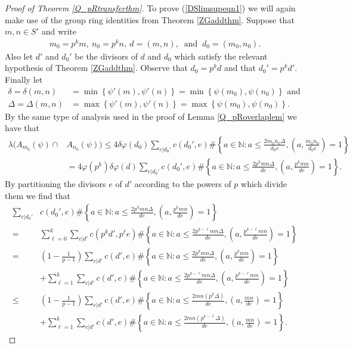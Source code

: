 \documentclass[12pt,reqno]{amsart}
\begin{document}
\begin{proof}[Proof of Theorem \ref{Q_pRtransferthm}]
To prove (\ref{DSlimsupeqn1}) we will again make use of the group ring identities from Theorem \ref{ZGaddthm}. Suppose that $m,n\in S'$ and write
\begin{align*}
m_0=p^km, ~n_0=p^kn, ~d=(m,n), ~\text{ and }~d_0=(m_0,n_0).
\end{align*}
Also let $d'$ and $d_0'$ be the divisors of $d$ and $d_0$ which satisfy the relevant hypothesis of Theorem \ref{ZGaddthm}. Observe that $d_0=p^kd$ and that $d_0'=p^kd'.$ Finally let
\begin{align*}
\delta =\delta(m,n)&=\min\left\{\psi' (m),\psi' (n)\right\}=\min\left\{\psi (m_0),\psi (n_0)\right\}\text{ and }\\
\Delta =\Delta(m,n)&=\max\left\{\psi' (m),\psi' (n)\right\}=\max\left\{\psi (m_0),\psi (n_0)\right\}.
\end{align*}
By the same type of analysis used in the proof of Lemma \ref{Q_pRoverlaplem} we have that
\begin{align*}
\lambda (A_{m_0}(\psi)\cap &A_{n_0}(\psi))
\le 4\delta\varphi (d_0)\sum_{e|d_0'}c(d_0',e)\#\left\{a\in{\mathbb{N}} :a\le\frac{2m_0n_0\Delta}{d_0e}, \left(a,\frac{m_0n_0}{d_0e}\right)=1\right\}\\
&=4\varphi (p^k)\delta\varphi (d)\sum_{e|d_0'}c(d_0',e)\#\left\{a\in{\mathbb{N}} :a\le\frac{2p^kmn\Delta}{de}, \left(a,\frac{p^kmn}{de}\right)=1\right\}.
\end{align*}
By partitioning the divisors $e$ of $d'$ according to the powers of $p$ which divide them we find that
\begin{align*}
\sum_{e|d_0'}&c(d_0',e)\#\left\{a\in{\mathbb{N}} :a\le\frac{2p^kmn\Delta}{de}, \left(a,\frac{p^kmn}{de}\right)=1\right\}\\
=&\sum_{\ell=0}^k\sum_{e|d'}c(p^kd',p^\ell e)\#\left\{a\in{\mathbb{N}} :a\le\frac{2p^{k-\ell}mn\Delta}{de}, \left(a,\frac{p^{k-\ell}mn}{de}\right)=1\right\}\\
=&\left(1-\frac{1}{p-1}\right)\sum_{e|d'}c(d',e)\#\left\{a\in{\mathbb{N}} :a\le\frac{2p^kmn\Delta}{de}, \left(a,\frac{p^kmn}{de}\right)=1\right\}\\
&+\sum_{\ell=1}^k\sum_{e|d'}c(d',e)\#\left\{a\in{\mathbb{N}} :a\le\frac{2p^{k-\ell}mn\Delta}{de}, \left(a,\frac{p^{k-\ell}mn}{de}\right)=1\right\}\\
\le&\left(1-\frac{1}{p-1}\right)\sum_{e|d'}c(d',e)\#\left\{a\in{\mathbb{N}} :a\le\frac{2mn(p^k\Delta)}{de}, \left(a,\frac{mn}{de}\right)=1\right\}\\
&+\sum_{\ell=1}^k\sum_{e|d'}c(d',e)\#\left\{a\in{\mathbb{N}} :a\le\frac{2mn(p^{k-\ell}\Delta)}{de}, \left(a,\frac{mn}{de}\right)=1\right\}.

\end{align*}
\end{proof}
\end{document}
